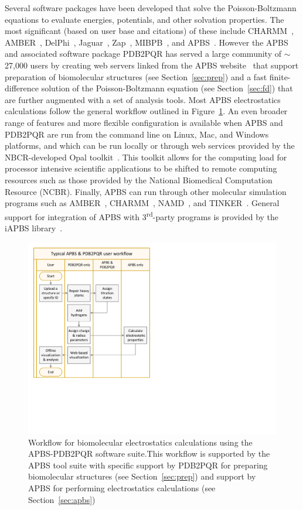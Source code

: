 \documentclass[12pt,titlepage]{article}
\begin{document}
Several software packages have been developed that solve the Poisson-Boltzmann equations to evaluate energies, potentials, and other solvation properties.
The most significant (based on user base and citations) of these include CHARMM~\cite{Brooks2009}, AMBER~\cite{Case2005}, DelPhi~\cite{Sarkar2013}, Jaguar~\cite{Bochevarov2013}, Zap~\cite{Grant2001}, MIBPB~\cite{Chen2011}, and APBS~\cite{Baker2001a}.
However the APBS and associated software package PDB2PQR has served a large community of $\sim$27,000 users by creating web servers linked from the APBS website~\cite{APBSweb} that support preparation of biomolecular structures (see Section~\ref{sec:prep}) and a fast finite-difference solution of the Poisson-Boltzmann equation (see Section~\ref{sec:fd}) that are further augmented with a set of analysis tools.
Most APBS electrostatics calculations follow the general workflow outlined in Figure~\ref{fig:PDB2PQR-APBS}.
An even broader range of features and more flexible configuration is available when APBS and PDB2PQR are run from the command line on Linux, Mac, and Windows platforms, and which can be run locally or through web services provided by the NBCR-developed Opal toolkit~\cite{Krishnan2009}.
This toolkit allows for the computing load for processor intensive scientific applications to be shifted to remote computing resources such as those provided by the National Biomedical Computation Resource (NCBR).
Finally, APBS can run through other molecular simulation programs such as AMBER~\cite{Case2005}, CHARMM~\cite{Brooks2009}, NAMD~\cite{Phillips2005}, and TINKER~\cite{TINKER}.
General support for integration of APBS with 3\textsuperscript{rd}-party programs is provided by the iAPBS library~\cite{Konecny2012, iAPBSweb}.
\begin{figure}
	\centering
	\includegraphics[width=0.60\linewidth]{APBS-and-PDB2PQR-user-flow} 
	\caption{Workflow for biomolecular electrostatics calculations using the APBS-PDB2PQR software suite.This workflow is supported by the APBS tool suite with specific support by PDB2PQR for preparing biomolecular structures (see Section~\ref{sec:prep}) and support by APBS for performing electrostatics calculations (see Section~\ref{sec:apbs})}
	\label{fig:PDB2PQR-APBS}
\end{figure}
\end{document}
